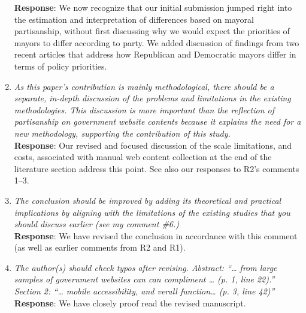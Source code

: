 \documentclass[12pt,titlepage]{article}
\begin{document}
\begin{enumerate}
    \textbf{Response}: We now recognize that our initial submission jumped right into the estimation and interpretation of differences based on mayoral partisanship, without first discussing why we would expect the priorities of mayors to differ according to party. We added discussion of findings from two recent articles that address how Republican and Democratic mayors differ in terms of policy priorities.
    
    \item \emph{As this paper’s contribution is mainly methodological, there should be a separate, in-depth discussion of the problems and limitations in the existing methodologies. This discussion is more important than the reflection of partisanship on government website contents because it explains the need for a new methodology, supporting the contribution of this study.}\\

    \textbf{Response}:  Our revised and focused discussion of the scale limitations, and costs, associated with manual web content collection at the end of the literature section address this point. See also our responses to R2's comments 1--3.
    
        \item \emph{The conclusion should be improved by adding its theoretical and practical implications by aligning with the limitations of the existing studies that you should discuss earlier (see my comment \#6.)}\\

    \textbf{Response}:  We have revised the conclusion in accordance with this comment (as well as earlier comments from R2 and R1). 
    
    
            \item \emph{The author(s) should check typos after revising. Abstract: “… from large samples of government websites can can compliment … (p. 1, line 22).” Section 2: “… mobile accessibility, and verall function… (p. 3, line 42)”}\\

    \textbf{Response}: We have closely proof read the revised manuscript.


    

\end{enumerate}





\newpage
\singlespacing
%
% 
\end{document}
